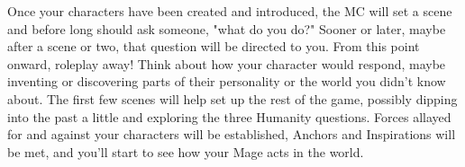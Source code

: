 \documentclass[
  oneside,
  statementpaper,
  9pt]{memoir}
\begin{document}
\begin{Player}

Once your characters have been created and introduced, the MC will set a scene and before long should ask someone, "what do you do?" Sooner or later, maybe after a scene or two, that question will be directed to you. From this point onward, roleplay away! Think about how your character would respond, maybe inventing or discovering parts of their personality or the world you didn't know about. The first few scenes will help set up the rest of the game, possibly dipping into the past a little and exploring the three Humanity questions. Forces allayed for and against your characters will be established, Anchors and Inspirations will be met, and you'll start to see how your Mage acts in the world.

\end{Player}
\end{document}

